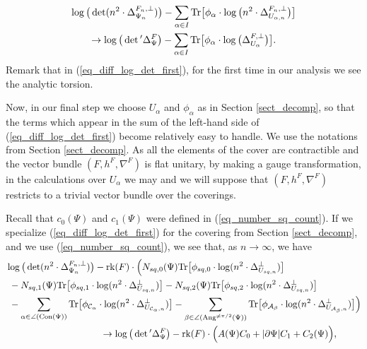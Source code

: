 \documentclass[12pt]{article}
\numberwithin{equation}{section}
\theoremstyle{theorem}
\theoremstyle{definition}
\theoremstyle{remark}
\newcommand{\laplcomp}{\Delta}
\newcommand{\rk}[1]{{\rm{rk}} ( #1 )}
\newcommand{\tr}[1]{{\rm{Tr}} \big[ #1 \big]}
\begin{document}
	\begin{multline}\label{eq_diff_log_det_first}
		\log \big(\det(n^2 \cdot\laplcomp_{\Psi_n}^{F_n, \perp})\big)
		-
		\sum_{\alpha \in I} \tr{\phi_{\alpha} \cdot \log \big(n^2 \cdot \laplcomp_{U_{\alpha, n}}^{F_n, \perp}\big)}
		\\
		\to
		\log \big( \det{}'\laplcomp_{\Psi}^{F} \big)
		-
		\sum_{\alpha \in I} \tr{\phi_{\alpha} \cdot \log \big(\laplcomp_{U_{\alpha}}^{F, \perp}\big)}.
	\end{multline}
	Remark that in (\ref{eq_diff_log_det_first}), for the first time in our analysis we see the analytic torsion.
	\par 
	Now, in our final step we choose $U_{\alpha}$ and $\phi_{\alpha}$ as in Section \ref{sect_decomp}, so that the terms which appear in the sum of the left-hand side of (\ref{eq_diff_log_det_first}) become relatively easy to handle. 
	We use the notations from Section \ref{sect_decomp}.
	As all the elements of the cover are contractible and the vector bundle $(F, h^F, \nabla^F)$ is flat unitary, by making a gauge transformation, in the calculations over $U_{\alpha}$ we may and we will suppose that  $(F, h^F, \nabla^F)$ restricts to a trivial vector bundle over the coverings.
	\par
	Recall that $c_0(\Psi)$ and $c_1(\Psi)$ were defined in (\ref{eq_number_sq_count}).
	If we specialize (\ref{eq_diff_log_det_first}) for the covering from Section \ref{sect_decomp}, and we use (\ref{eq_number_sq_count}), we see that, as $n \to \infty$, we have
	\begin{equation}\label{eq_diff_log_det_secon2}
	\begin{aligned}
		& \log \big(\det(n^2 \cdot\laplcomp_{\Psi_n}^{F_n, \perp})\big)
		-
		\rk{F}
		\cdot
		\Big(
		N_{sq, 0}(\Psi) \tr{\phi_{sq, 0} \cdot \log (n^2 \cdot \laplcomp_{U_{sq, n}}^{\perp}) }
		\\
		&
		\, \,
		-
		N_{sq, 1}(\Psi) \tr{\phi_{sq, 1} \cdot \log (n^2 \cdot \laplcomp_{U_{sq, n}}^{\perp}) }
		-
		N_{sq, 2}(\Psi) \tr{\phi_{sq, 2} \cdot \log (n^2 \cdot \laplcomp_{U_{sq, n}}^{\perp}) }
		\\
		&
		\, \,
		-
		\sum_{\alpha \in \angle({\rm{Con}}(\Psi))}
		\tr{\phi_{\mathcal{C}_{\alpha}} \cdot \log (n^2 \cdot \laplcomp_{U_{\mathcal{C}_{\alpha}, n}}^{\perp})  }
		-
		\sum_{\beta \in \angle({\rm{Ang}}^{\neq \pi/2}(\Psi))}
		\tr{\phi_{\mathcal{A}_{\beta}} \cdot \log (n^2 \cdot \laplcomp_{U_{\mathcal{A}_{\beta}, n}}^{\perp})  }
		\Big)
		\\
		&
		\qquad \qquad \qquad \qquad \qquad 
		\to
		\log \big( \det{}'\laplcomp_{\Psi}^{F} \big)
		-
		\rk{F} \cdot \Big(
		A(\Psi)C_0 
		+
		|\partial \Psi| C_1 
		+
		C_2(\Psi)
		\Big),
	\end{aligned}
	\end{equation}
\end{document}
